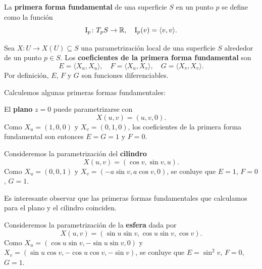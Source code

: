 \begin{definition}
	La \textbf{primera forma fundamental} de una superficie $S$ en un punto $p$ 
	se define como la función
	\[
		\operatorname{I}_p\colon T_pS\to\mathbb{R},\quad
		\operatorname{I}_p(v)=\langle v,v\rangle.
	\]
\end{definition}

Sea $X\colon U\to X(U)\subseteq S$ una parametrización local de una superficie
$S$ alrededor de un punto $p\in S$.  Los \textbf{coeficientes de la primera forma
fundamental} son 
\[
	E=\langle X_u,X_u\rangle,\quad
	F=\langle X_u,X_v\rangle,\quad
	G=\langle X_v,X_v\rangle.
\]
Por definición, $E$, $F$ y $G$ son funciones diferenciables. 

Calculemos algunas primeras formas fundamentales:

\begin{example}
	El \textbf{plano} $z=0$ puede parametrizarse con 
	\[
	X(u,v)=(u,v,0).
	\]
	Como $X_u=(1,0,0)$ y $X_v=(0,1,0)$, los coeficientes de la primera forma
	fundamental son entonces $E=G=1$ y $F=0$. 
\end{example}


\begin{example}
	Consideremos la parametrización del \textbf{cilindro} 
	\[
	X(u,v)=(\cos v ,\sin v,u). 
	\]
	Como $X_u=(0,0,1)$ y $X_v=(-a\sin v ,a\cos v ,0)$, se conluye que $E=1$,
	$F=0$, $G=1$. 
\end{example}

Es interesante observar que las primeras formas fundamentales que calculamos
para el plano y el cilindro coinciden.

\begin{example}
	Consideremos la parametrización de la \textbf{esfera} dada por 
	\[
	X(u,v)=(\sin u\sin v,\cos u\sin v,\cos v).
	\]
	Como $X_u=(\cos u\sin v,-\sin u\sin v,0)$ y $X_v=(\sin u\cos v,-\cos
	u\cos v,-\sin v)$, se conluye que $E=\sin^2v$, $F=0$, $G=1$. 
\end{example}

